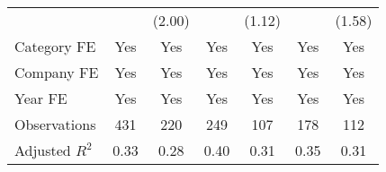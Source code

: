 {\begin{tabular}{l*{6}{c}}
                                   &                     &      (2.00)         &                     &      (1.12)         &                     &      (1.58)         \\
[1em]
Category FE                        &         Yes         &         Yes         &         Yes         &         Yes         &         Yes         &         Yes         \\
[1em]
Company FE                         &         Yes         &         Yes         &         Yes         &         Yes         &         Yes         &         Yes         \\
[1em]
Year FE                            &         Yes         &         Yes         &         Yes         &         Yes         &         Yes         &         Yes         \\
\hline
Observations                       &         431         &         220         &         249         &         107         &         178         &         112         \\
Adjusted \(R^{2}\)                 &        0.33         &        0.28         &        0.40         &        0.31         &        0.35         &        0.31         \\
\hline\hline
\end{tabular}
}
